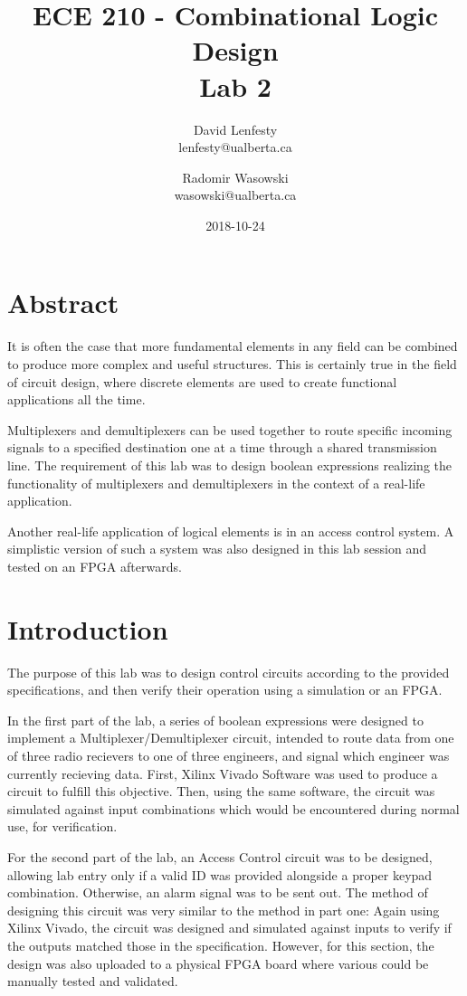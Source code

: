 \documentclass{article}
\title{ECE 210 - Combinational Logic Design \\ Lab 2}
\date{2018-10-24}
\author{David Lenfesty \\ lenfesty@ualberta.ca
    \and Radomir Wasowski \\ wasowski@ualberta.ca}
\begin{document}
    \doublespacing
    \maketitle
    \newpage

    \singlespacing

    \section{Abstract}

    It is often the case that more fundamental elements in any field can be
    combined to produce more complex and useful structures. This is certainly
    true in the field of circuit design, where discrete elements are used
    to create functional applications all the time.

    Multiplexers and demultiplexers can be used together to route specific
    incoming signals to a specified destination one at a time through a
    shared transmission line. The requirement of this lab was to design
    boolean expressions realizing the functionality of multiplexers and
    demultiplexers in the context of a real-life application.
    
    Another real-life application of logical elements is in an access control
    system. A simplistic version of such a system was also designed in this
    lab session and tested on an FPGA afterwards.

    \section{Introduction}

    The purpose of this lab was to design control circuits according to the provided
    specifications, and then verify their operation using a simulation or an FPGA.

    In the first part of the lab, a series of boolean expressions
    were designed to implement a Multiplexer/Demultiplexer circuit,
    intended to route data from one of three radio recievers to one
    of three engineers, and signal which engineer was currently
    recieving data.
    First, Xilinx Vivado Software was used to produce a circuit
    to fulfill this objective. Then, using the same software,
    the circuit was simulated against input combinations which
    would be encountered during normal use, for verification.

    For the second part of the lab, an Access Control circuit was to be designed,
    allowing lab entry only if a valid ID was provided alongside a proper keypad
    combination. Otherwise, an alarm signal was to be sent out.
    The method of designing this circuit was very similar to the method in part one:
    Again using Xilinx Vivado, the circuit was designed and simulated against inputs
    to verify if the outputs matched those in the specification.
    However, for this section, the design was also uploaded to a physical FPGA board
    where various could be manually tested and validated.
\end{document}
